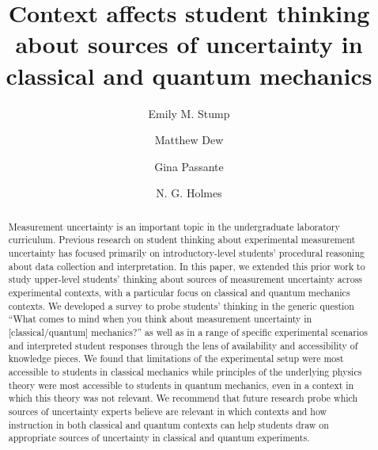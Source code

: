 \documentclass[english,aps,prstper,reprint,showpacs,longbibliography,superscriptaddress,nofootinbib]{revtex4-2}
\begin{document}
\begin{titlepage}

  
  \title{Context affects student thinking about sources of uncertainty in classical and quantum mechanics}

  \author{Emily M. Stump}
  \author{Matthew Dew}
  \author{Gina Passante}
   \author{N. G. Holmes}


  \begin{abstract}
    Measurement uncertainty is an important topic in the undergraduate laboratory curriculum. Previous research on student thinking about experimental measurement uncertainty has focused primarily on introductory-level students' procedural reasoning about data collection and interpretation. In this paper, we extended this prior work to study upper-level students' thinking about sources of measurement uncertainty across experimental contexts, with a particular focus on classical and quantum mechanics contexts. We developed a survey to probe students' thinking in the generic question ``What comes to mind when you think about measurement uncertainty in [classical/quantum] mechanics?'' as well as in a range of specific experimental scenarios and interpreted student responses through the lens of availability and accessibility of knowledge pieces. We found that limitations of the experimental setup were most accessible to students in classical mechanics while principles of the underlying physics theory were most accessible to students in quantum mechanics, even in a context in which this theory was not relevant. We recommend that future research probe which sources of uncertainty experts believe are relevant in which contexts and how instruction in both classical and quantum contexts can help students draw on appropriate sources of uncertainty in classical and quantum experiments.
  \end{abstract}
  
  \maketitle
\end{titlepage}
\end{document}
